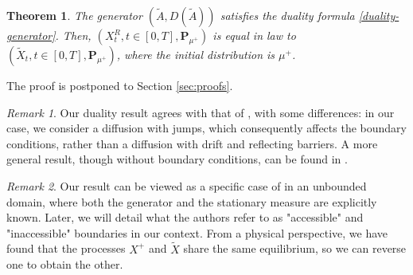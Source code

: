 \documentclass[11pt,a4paper]{article}
\newtheorem{theorem}{Theorem}
\theoremstyle{definition}
\theoremstyle{remark}
\newtheorem{remark}{Remark}
\begin{document}
\begin{theorem}
	\label{thm:time-reverse}
	The generator \((\widetilde{A}, {D}(\widetilde{A}))\) satisfies the duality formula \eqref{duality-generator}. Then, \((X^R_t , t \in [0,T], \mathbf{P}_{\mu^+})\) is equal in law to \((\widetilde{X}_t , t \in [0,T], \mathbf{P}_{\mu^+})\), where the initial distribution is \(\mu^+\).
\end{theorem}
\noindent
The proof is postponed to Section \ref{sec:proofs}.
\begin{remark}
	Our duality result agrees with that of \cite{nagasawa-reflecting}, with some differences: in our case, we consider a diffusion with jumps, which consequently affects the boundary conditions, rather than a diffusion with drift and reflecting barriers. A more general result, though without boundary conditions, can be found in \cite{nelson}.
\end{remark}
\begin{remark}
	Our result can be viewed as a specific case of \cite[Theorem 2.1]{reverse-jumps} in an unbounded domain,
	where both the generator and the stationary measure are explicitly known. Later, we will detail what the authors refer to as "accessible" and "inaccessible" boundaries in our context. From a physical perspective, we have found that the processes \(X^+\) and \(\widetilde{X}\) share the same equilibrium, so we can reverse one to obtain the other.
\end{remark}
\end{document}
